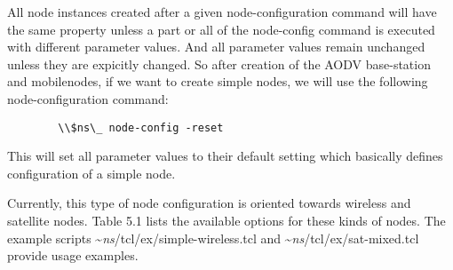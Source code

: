All node instances created after a given node-configuration command will
have the same property unless a part or all of the node-config command is
executed with different parameter values. And all parameter values remain
unchanged unless they are expicitly changed. So after creation of the AODV
base-station and mobilenodes, if we want to create simple nodes, we will
use the following node-configuration command:
\begin{verbatim}
        \\$ns\_ node-config -reset
\end{verbatim}
This will set all parameter values to their default setting which
basically defines configuration of a simple node.

Currently, this type of node configuration is oriented towards wireless
and satellite nodes.  Table 5.1
lists the available options
for these kinds of nodes.  The example scripts 
\textasciitilde\emph{ns}/{tcl/ex/simple-wireless.tcl} and \textasciitilde\emph{ns}/{tcl/ex/sat-mixed.tcl} provide
usage examples.

